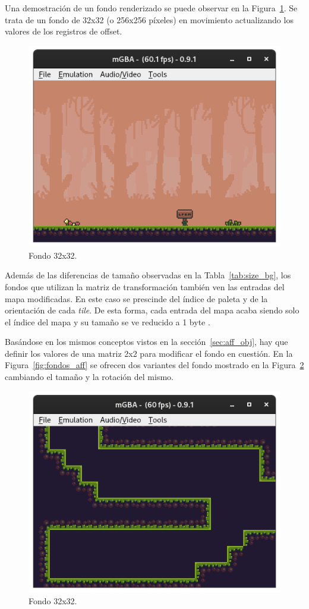 Una demostración de un fondo renderizado se puede observar en la Figura~\ref{fig:fondo_1}. Se trata de un fondo de 32x32 (o 256x256 píxeles) en movimiento actualizando los valores de los registros de offset.

\begin{figure}[h]
     \centering
         \includegraphics[width=.55\textwidth]{capitulos/capitulo3/fondo_1.png}
	\caption{Fondo 32x32.}\label{fig:fondo_1}
\end{figure}
\FloatBarrier{}

Además de las diferencias de tamaño observadas en la Tabla~\ref{tab:size_bg}, los fondos que utilizan la matriz de transformación también ven las entradas del mapa modificadas. En este caso se prescinde del índice de paleta y de la orientación de cada \textit{tile}. De esta forma, cada entrada del mapa acaba siendo solo el índice del mapa y su tamaño se ve reducido a 1 byte \cite{bib:tonc}.

Basándose en los mismos conceptos vistos en la sección~\ref{sec:aff_obj}, hay que definir los valores de una matriz 2x2 para modificar el fondo en cuestión. En la Figura~\ref{fig:fondos_aff} se ofrecen dos variantes del fondo mostrado en la Figura~\ref{fig:fondo_2} cambiando el tamaño y la rotación del mismo.

\begin{figure}[h]
     \centering
         \includegraphics[width=.55\textwidth]{capitulos/capitulo3/affine_bg_1.png}
	\caption{Fondo 32x32.}\label{fig:fondo_2}
\end{figure}
\FloatBarrier{}

